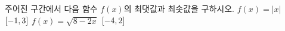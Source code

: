 주어진 구간에서 다음 함수 $f(x)$의 최댓값과 최솟값을 구하시오.
 $f(x)=|x|$ \quad $[-1{,}\mkern3mu\mathopen{}3]$
 $f(x)=\sqrt{8-2x}$ \quad $[-4{,}\mkern3mu\mathopen{}2]$
